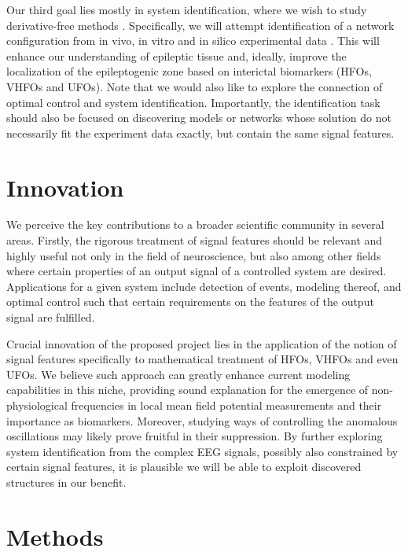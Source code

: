 \documentclass[a4paper,11pt]{scrartcl}
\begin{document}
Our third goal lies mostly in system identification, where we wish to study derivative-free methods \cite{Bortz2023, Lejarza2022, Messenger2024}. Specifically, we will attempt identification of a network configuration from in vivo, in vitro and in silico experimental data \cite{Champion2019}. This will enhance our understanding of epileptic tissue and, ideally, improve the localization of the epileptogenic zone based on interictal biomarkers (HFOs, VHFOs and UFOs). Note that we would also like to explore the connection of optimal control and system identification. Importantly, the identification task should also be focused on discovering models or networks whose solution do not necessarily fit the experiment data exactly, but contain the same signal features.

\section{Innovation}\label{sec:innovation}

We perceive the key contributions to a broader scientific community in several areas. Firstly, the rigorous treatment of signal features should be relevant and highly useful not only in the field of neuroscience, but also among other fields where certain properties of an output signal of a controlled system are desired. Applications for a given system include detection of events, modeling thereof, and optimal control such that certain requirements on the features of the output signal are fulfilled.

Crucial innovation of the proposed project lies in the application of the notion of signal features specifically to mathematical treatment of HFOs, VHFOs and even UFOs. We believe such approach can greatly enhance current modeling capabilities in this niche, providing sound explanation for the emergence of non-physiological frequencies in local mean field potential measurements and their importance as biomarkers. Moreover, studying ways of controlling the anomalous oscillations may likely prove fruitful in their suppression. By further exploring system identification from the complex EEG signals, possibly also constrained by certain signal features, it is plausible we will be able to exploit discovered structures in our benefit.


\section{Methods}\label{sec:methods}
\end{document}
